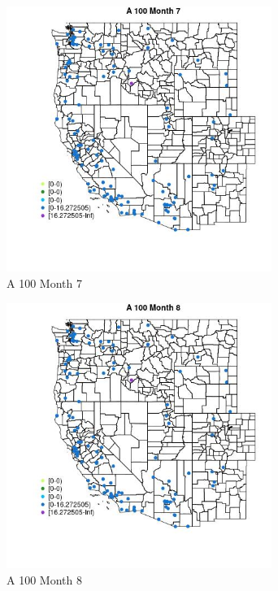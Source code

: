 \begin{figure} 
\centering  
\includegraphics[width=0.77\textwidth]{Code_Outputs/Report_ML_input_PM25_Step4_part_e_de_duplicated_aves_MapObsMo7A_100.jpg} 
\caption{\label{fig:Report_ML_input_PM25_Step4_part_e_de_duplicated_avesMapObsMo7A_100}A 100 Month 7} 
\end{figure} 
 

\clearpage 

\begin{figure} 
\centering  
\includegraphics[width=0.77\textwidth]{Code_Outputs/Report_ML_input_PM25_Step4_part_e_de_duplicated_aves_MapObsMo8A_100.jpg} 
\caption{\label{fig:Report_ML_input_PM25_Step4_part_e_de_duplicated_avesMapObsMo8A_100}A 100 Month 8} 
\end{figure} 
 

